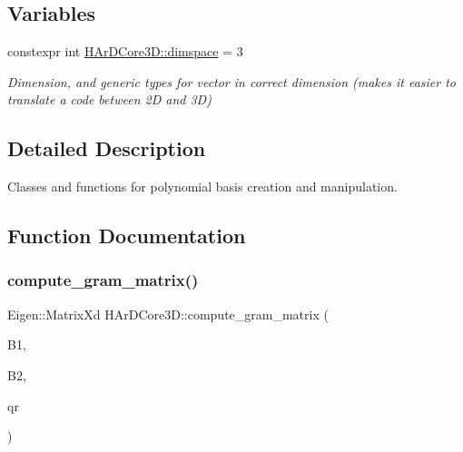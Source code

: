 \subsection*{Variables}
\begin{DoxyCompactItemize}
\item 
\mbox{\label{group__Basis_ga23a211ab9d745e2e803ad606e1df445f}} 
constexpr int \hyperlink{group__Basis_ga23a211ab9d745e2e803ad606e1df445f}{H\+Ar\+D\+Core3\+D\+::dimspace} = 3
\begin{DoxyCompactList}\small\item\em Dimension, and generic types for vector in correct dimension (makes it easier to translate a code between 2D and 3D) \end{DoxyCompactList}\end{DoxyCompactItemize}


\subsection{Detailed Description}
Classes and functions for polynomial basis creation and manipulation. 



\subsection{Function Documentation}
\mbox{\label{group__Basis_gaf5cc3ed71949b5d7adc5877e6bfebcb4}} 
\subsubsection{\texorpdfstring{compute\+\_\+gram\+\_\+matrix()}{compute\_gram\_matrix()}\hspace{0.1cm}{\footnotesize\ttfamily [1/8]}}
{\footnotesize\ttfamily Eigen\+::\+Matrix\+Xd H\+Ar\+D\+Core3\+D\+::compute\+\_\+gram\+\_\+matrix (\begin{DoxyParamCaption}\item[{const boost\+::multi\+\_\+array$<$ Vector\+Rd, 2 $>$ \&}]{B1,  }\item[{const boost\+::multi\+\_\+array$<$ double, 2 $>$ \&}]{B2,  }\item[{const Quadrature\+Rule \&}]{qr }\end{DoxyParamCaption})}

